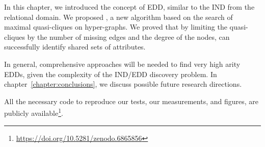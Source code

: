 In this chapter, we introduced the concept of \gls{EDD}, similar to the \gls{IND} from
the relational domain. We proposed \PresQ, a new algorithm based on the search of
maximal quasi-cliques on hyper-graphs. We proved that by limiting the quasi-cliques
by the number of missing edges and the degree of the nodes, \PresQ can successfully
identify shared sets of attributes.

In general, comprehensive approaches will be needed to find very high arity \glspl{EDD},
given the complexity of the \gls{IND}/\gls{EDD} discovery problem.
In chapter~\ref{chapter:conclusions}, we discuss possible future research directions.

All the necessary code to reproduce our tests, our
measurements, and figures, are publicly available\footnote{\url{https://doi.org/10.5281/zenodo.6865856}}.
